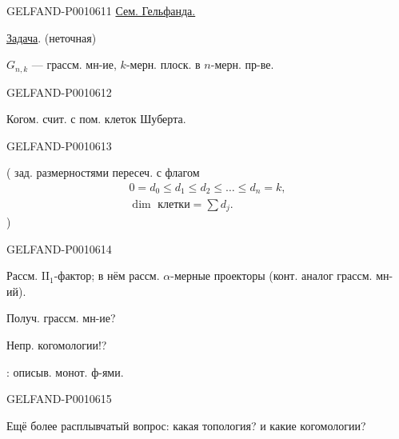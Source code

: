 \begin{GelfandAdjacentEvidence}{GELFAND-P001061}{1}
\qquad\underline{Сем. Гельфанда.}

\quad\underline{Задача}. (неточная)

\(G_{n,k}\) — грассм. мн-ие, \(k\)-мерн. плоск. в \(n\)-мерн. пр-ве.
\end{GelfandAdjacentEvidence}
\begin{GelfandAdjacentEvidence}{GELFAND-P001061}{2}


Когом. счит. с пом. клеток Шуберта.
\end{GelfandAdjacentEvidence}
\begin{GelfandAdjacentEvidence}{GELFAND-P001061}{3}


({}  зад. размерностями пересеч. с флагом
\begin{gather*}
0=d_0\leqslant d_1\leqslant d_2\leqslant\ldots\leqslant d_n=k,\\
\dim\text{ клетки}=\sum d_j.
\end{gather*}
)
\end{GelfandAdjacentEvidence}
\begin{GelfandAdjacentEvidence}{GELFAND-P001061}{4}


Рассм. \(\mathrm{II}_1\)-фактор; в нём рассм. \(\alpha\)-мерные проекторы (конт. аналог грассм. мн-ий).


Получ. грассм. мн-ие?

Непр. когомологии!?

: описыв. монот. ф-ями.
\end{GelfandAdjacentEvidence}
\begin{GelfandAdjacentEvidence}{GELFAND-P001061}{5}


Ещё более расплывчатый вопрос: какая топология? и какие когомологии?
\end{GelfandAdjacentEvidence}
